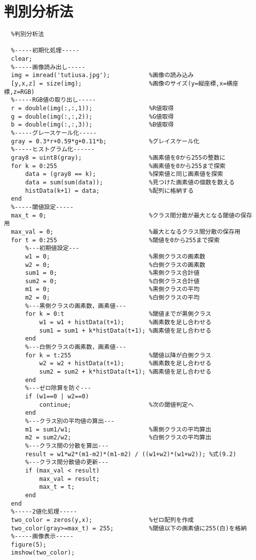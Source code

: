 \documentclass[a4j]{jarticle}
\begin{document}
\section{判別分析法}
\begin{verbatim}
  %判別分析法

  %-----初期化処理-----
  clear;
  %-----画像読み出し-----
  img = imread('tutiusa.jpg');           %画像の読み込み
  [y,x,z] = size(img);                   %画像のサイズ(y=縦座標,x=横座標,z=RGB)
  %-----RGB値の取り出し-----
  r = double(img(:,:,1));                %R値取得
  g = double(img(:,:,2));                %G値取得
  b = double(img(:,:,3));                %B値取得
  %-----グレースケール化-----
  gray = 0.3*r+0.59*g+0.11*b;            %グレイスケール化
  %-----ヒストグラム化------
  gray8 = uint8(gray);                   %画素値を0から255の整数に
  for k = 0:255                          %画素値を0から255まで探索
      data = (gray8 == k);               %探索値と同じ画素値を探索
      data = sum(sum(data));             %見つけた画素値の個数を数える
      histData(k+1) = data;              %配列に格納する
  end
  %-----閾値設定-----
  max_t = 0;                             %クラス間分散が最大となる閾値の保存用
  max_val = 0;                           %最大となるクラス間分散の保存用
  for t = 0:255                          %閾値を0から255まで探索
      %---初期値設定---
      w1 = 0;                            %黒側クラスの画素数
      w2 = 0;                            %白側クラスの画素数
      sum1 = 0;                          %黒側クラス合計値
      sum2 = 0;                          %白側クラス合計値
      m1 = 0;                            %黒側クラスの平均
      m2 = 0;                            %白側クラスの平均
      %---黒側クラスの画素数，画素値---
      for k = 0:t                        %閾値までが黒側クラス
          w1 = w1 + histData(t+1);       %画素数を足し合わせる
          sum1 = sum1 + k*histData(t+1); %画素値を足し合わせる
      end
      %---白側クラスの画素数，画素値---
      for k = t:255                      %閾値以降が白側クラス
          w2 = w2 + histData(t+1);       %画素数を足し合わせる
          sum2 = sum2 + k*histData(t+1); %画素値を足し合わせる
      end
      %---ゼロ除算を防ぐ---
      if (w1==0 | w2==0)
          continue;                      %次の閾値判定へ
      end
      %---クラス別の平均値の算出---
      m1 = sum1/w1;                      %黒側クラスの平均算出
      m2 = sum2/w2;                      %白側クラスの平均算出
      %---クラス間の分散を算出---
      result = w1*w2*(m1-m2)*(m1-m2) / ((w1+w2)*(w1+w2)); %式(9.2)
      %---クラス間分散値の更新---
      if (max_val < result)
          max_val = result;
          max_t = t;
      end
  end
  %-----2値化処理-----
  two_color = zeros(y,x);                %ゼロ配列を作成
  two_color(gray>=max_t) = 255;          %閾値以下の画素値に255(白)を格納
  %-----画像表示-----
  figure(5);
  imshow(two_color);
\end{verbatim}
\end{document}
